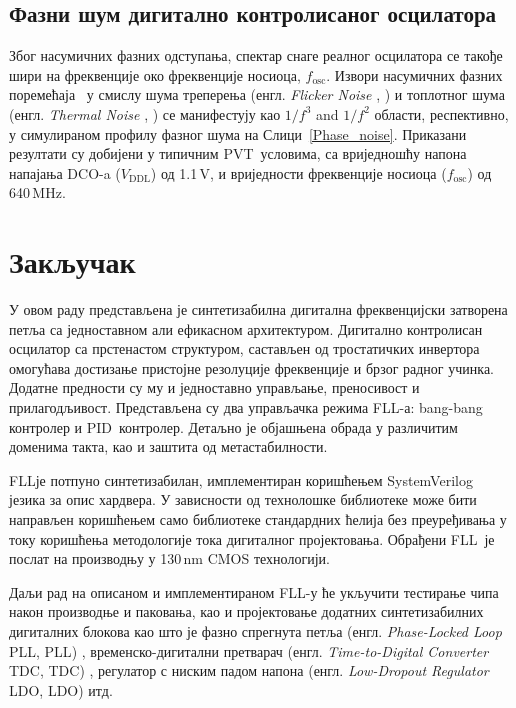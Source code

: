 \documentclass[master]{finthesis}
\makeatletter
\newcommand*{\engl}[2][\@empty]{%
    \edef\theacronym{#1}%
    (енгл. \foreignlanguage{english}{\emph{#2}%
    \ifx\theacronym\@empty \else , #1\fi})%
}
\def \FLL  {FLL} %
\def \DCO  {DCO} %
\def \PID  {PID} %
\def \PVT  {PVT} %
\makeatother
\begin{document}
\subsection{Фазни шум дигитално контролисаног осцилатора}
Због насумичних фазних одступања, спектар снаге реалног осцилатора се такође шири на фреквенције око фреквенције носиоца, $f_\text{osc}$. Извори насумичних фазних поремећаја~\cite{Milovanovic:8190103} у смислу шума треперења \engl{Flicker Noise} и топлотног шума \engl{Thermal Noise} се манифестују као $1/f^3$ and $1/f^2$ области, респективно, у симулираном профилу фазног шума на Слици~\ref{Phase_noise}. Приказани резултати су добијени у типичним \PVT\ условима, са вриједношћу напона напајања \DCO-a ($V_\text{DDL}$) од 1.1\,V, и вриједности фреквенције носиоца ($f_\text{osc}$) од 640\,MHz.



\section{Закључак} \label{Conclusion}
У овом раду представљена је синтетизабилна дигитална фреквенцијски затворена петља са једноставном али ефикасном архитектуром. Дигитално контролисан осцилатор са прстенастом структуром, састављен од тростатичких инвертора омогућава достизање пристојне резолуције фреквенције и брзог радног учинка. Додатне предности су му и једноставно управљање, преносивост и прилагодљивост. Представљена су два управљачка режима \FLL-а: bang-bang контролер и \PID\ контролер. Детаљно је објашњена обрада у различитим доменима такта, као и заштита од метастабилности. \par
\FLL је потпуно синтетизабилан, имплементиран коришћењем SystemVerilog језика за опис хардвера. У зависности од технолошке библиотеке може бити направљен коришћењем само библиотеке стандардних ћелија без преуређивања у току коришћења методологије тока дигиталног пројектовања. Обрађени \FLL\ је послат на производњу у 130\,nm CMOS технологији. \par
Даљи рад на описаном и имплементираном \FLL-у ће укључити тестирање чипа након производње и паковања, као и пројектовање додатних синтетизабилних дигиталних блокова као што је фазно спрегнута петља \engl[PLL]{Phase-Locked Loop}, временско-дигитални претварач \engl[TDC]{Time-to-Digital Converter}, регулатор с ниским падом напона \engl[LDO]{Low-Dropout Regulator} итд.


\makebibliography
\end{document}
